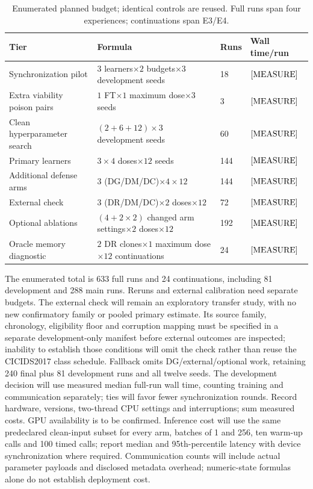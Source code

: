 \documentclass[10pt,a4paper]{article}
\newcommand{\meas}{\textnormal{[MEASURE]}}
\begin{document}
\begin{table}[htbp]
\centering\footnotesize
\caption{Enumerated planned budget; identical controls are reused. Full runs span four experiences; continuations span E3/E4.}
\label{tab:budget}
\begin{tabularx}{\linewidth}{Y L{4.8cm}L{1.1cm}L{2.5cm}}
\toprule
Tier & Formula & Runs & Wall time/run\\
\midrule
Synchronization pilot & $3$ learners$\times2$ budgets$\times3$ development seeds & 18 & $\meas$\\
Extra viability poison pairs & $1$ FT$\times1$ maximum dose$\times3$ seeds & 3 & $\meas$\\
Clean hyperparameter search & $(2+6+12)\times3$ development seeds & 60 & $\meas$\\
Primary learners & $3\times4$ doses$\times12$ seeds & 144 & $\meas$\\
Additional defense arms & $3$ (DG/DM/DC)$\times4\times12$ & 144 & $\meas$\\
External check & $3$ (DR/DM/DC)$\times2$ doses$\times12$ & 72 & $\meas$\\
Optional ablations & $(4+2\times2)$ changed arm settings$\times2$ doses$\times12$ & 192 & $\meas$\\
Oracle memory diagnostic & $2$ DR clones$\times1$ maximum dose$\times12$ continuations & 24 & $\meas$\\
\bottomrule
\end{tabularx}
\end{table}
The enumerated total is 633 full runs and 24 continuations, including 81 development and 288 main runs. Reruns and external calibration need separate budgets. The external check will remain an exploratory transfer study, with no new confirmatory family or pooled primary estimate. Its source family, chronology, eligibility floor and corruption mapping must be specified in a separate development-only manifest before external outcomes are inspected; inability to establish those conditions will omit the check rather than reuse the CICIDS2017 class schedule. Fallback omits DG/external/optional work, retaining 240 final plus 81 development runs and all twelve seeds. The development decision will use measured median full-run wall time, counting training and communication separately; ties will favor fewer synchronization rounds. Record hardware, versions, two-thread CPU settings and interruptions; sum measured costs. GPU availability is to be confirmed. Inference cost will use the same predeclared clean-input subset for every arm, batches of 1 and 256, ten warm-up calls and 100 timed calls; report median and 95th-percentile latency with device synchronization where required. Communication counts will include actual parameter payloads and disclosed metadata overhead; numeric-state formulas alone do not establish deployment cost.
\end{document}
